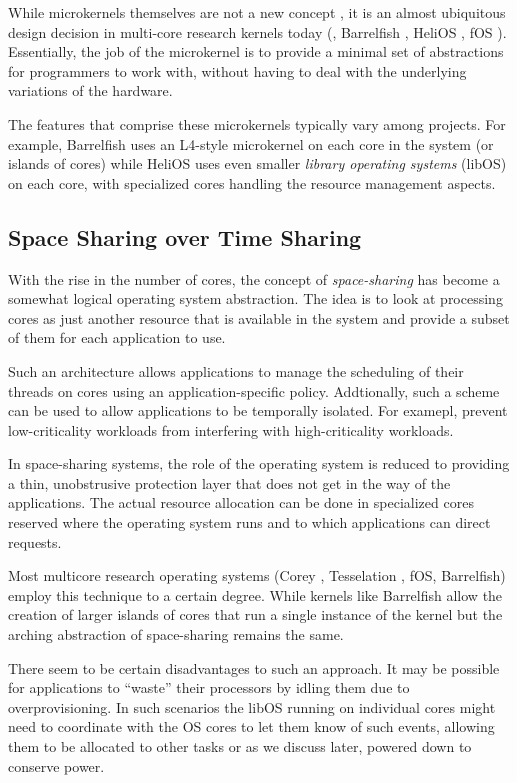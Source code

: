 While microkernels themselves are not a new concept  \cite{Liedtke, Mach, Amoeba}, it is an almost ubiquitous design decision in multi-core research kernels today (\eg, Barrelfish \cite{Barrelfish, Schupbach08embracingdiversity}, HeliOS \cite{Helios}, fOS \cite{fos}). Essentially, the job of the microkernel is to provide a minimal set of abstractions for programmers to work with, without having to deal with the underlying variations of the hardware.

The features that comprise these microkernels typically vary among projects. For example, Barrelfish uses an L4-style microkernel on each core in the system (or islands of cores) while HeliOS uses even smaller \emph{library operating systems} (libOS) on each core, with specialized cores handling the resource management aspects.

\subsection{Space Sharing over Time Sharing}

With the rise in the number of cores, the concept of \emph{space-sharing} has become a somewhat logical operating system abstraction. The idea is to look at processing cores as just another resource that is available in the system and provide a subset of them for each application to use.

Such an architecture allows applications to manage the scheduling of their threads on
cores using an application-specific policy. Addtionally, such a scheme can be used to allow applications to be temporally isolated. For examepl, prevent low-criticality workloads from interfering with high-criticality workloads.

In space-sharing systems, the role of the operating system is reduced to providing a thin, unobstrusive protection layer that does not get in the way of the applications. The actual resource allocation can be done in specialized cores reserved where the operating system runs and to which applications can direct requests.

Most multicore research operating systems (\eg Corey \cite{Corey}, Tesselation \cite{Tesselation}, fOS, Barrelfish) employ this technique to a certain degree. While kernels like Barrelfish allow the creation of larger islands of cores that run a single instance of the kernel but the arching abstraction of space-sharing remains the same.

There seem to be certain disadvantages to such an approach. It may be possible for applications to ``waste'' their processors by idling them due to overprovisioning. In such scenarios the libOS running on individual cores might need to coordinate with the OS cores to let them know of such events, allowing them to be allocated to other tasks or as we discuss later, powered down to conserve power.

